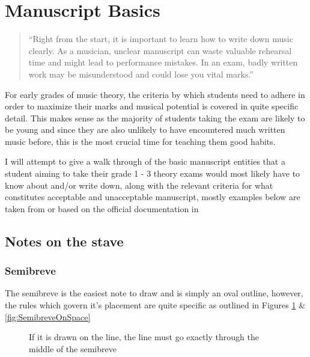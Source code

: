 \section{Manuscript Basics}

\blockquote{``Right from the start, it is important to learn how to write down music clearly. As a musician, unclear manuscript can waste valuable rehearsal time and might lead to performance mistakes. In an exam, badly written work may be misunderstood and could lose you vital marks.'' \cite{taylor1989ab}}


For early grades of music theory, the criteria by which students need to adhere in order to maximize their marks and musical potential is covered in quite specific detail. This makes sense as the majority of students taking the exam are likely to be young and since they are also unlikely to have encountered much written music before, this is the most crucial time for teaching them good habits.

I will attempt to give a walk through of the basic manuscript entities that a student aiming to take their grade 1 - 3 theory exams would most likely have to know about and/or write down, along with the relevant criteria for what constitutes acceptable and unacceptable manuscript, mostly examples below are taken from or based on the official documentation in \cite{taylor2008music}


\subsection*{Notes on the stave}

\subsubsection*{Semibreve}

The semibreve is the easiest note to draw and is simply an oval outline, however, the rules which govern it's placement are quite specific as outlined in Figures \ref{fig:SemibreveOnLine} \& \ref{fig:SemibreveOnSpace}

\begin{figure}[h!]
  \centering
  \caption{If it is drawn on the line, the line must go exactly through the middle of the semibreve}
  \label{fig:SemibreveOnLine}
\end{figure}

